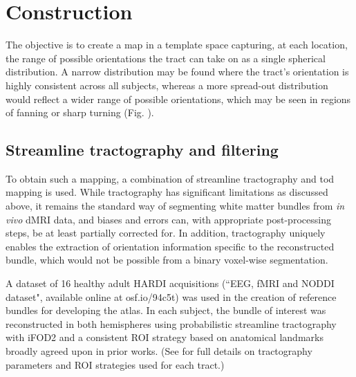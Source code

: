 \section{Construction}



The objective is to create a map in a template space capturing, at each location, the range of possible orientations the tract can take on as a single spherical distribution.
A narrow distribution may be found where the tract's orientation is highly consistent across all subjects, whereas a more spread-out distribution would reflect a wider range of possible orientations, which may be seen in regions of fanning or sharp turning (Fig. ).

\subsection{Streamline tractography and filtering}



To obtain such a mapping, a combination of streamline tractography and \gls{tod} mapping \autocite{Dhollander2014} is used.
While tractography has significant limitations as discussed above, it remains the standard way of segmenting white matter bundles from \textit{in vivo} dMRI data, and biases and errors can, with appropriate post-processing steps, be at least partially corrected for.
In addition, tractography uniquely enables the extraction of orientation information specific to the reconstructed bundle, which would not be possible from a binary voxel-wise segmentation.

A dataset of 16 healthy adult HARDI acquisitions (``EEG, fMRI and NODDI dataset",\autocite{Clayden2020} available online at osf.io/94c5t) was used in the creation of reference bundles for developing the atlas.
In each subject, the bundle of interest was reconstructed in both hemispheres using probabilistic streamline tractography with iFOD2 \autocite{Tournier2010} and a consistent ROI strategy based on anatomical landmarks broadly agreed upon in prior works. (See  for full details on tractography parameters and ROI strategies used for each tract.)

